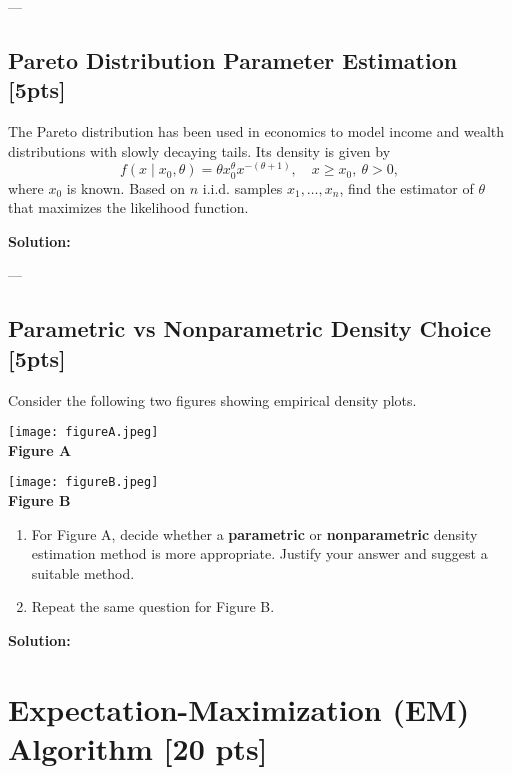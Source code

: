 \documentclass[11pt,epic]{article}
\newenvironment{solution}
  {\par\medskip
  \color{gray}%
   \begin{framed}
   \textbf{Solution: \newline}\ignorespaces}
 {\end{framed}
  \medskip}
\begin{document}
---

\subsection{Pareto Distribution Parameter Estimation [5pts]}  

The Pareto distribution has been used in economics to model income and wealth distributions with slowly decaying tails. Its density is given by  
\[
f(x \mid x_0, \theta) = \theta x_0^{\theta} x^{-(\theta+1)}, \quad x \geq x_0,\ \theta > 0,
\]  
where $x_0$ is known. Based on $n$ i.i.d. samples $x_1,\ldots,x_n$, find the estimator of $\theta$ that maximizes the likelihood function.  

\begin{solution}

\end{solution}  

---

\subsection{Parametric vs Nonparametric Density Choice [5pts]}  

Consider the following two figures showing empirical density plots.  

\begin{center}
\texttt{[image: figureA.jpeg]} \\
\textbf{Figure A}  

\vspace{0.5cm}
\texttt{[image: figureB.jpeg]} \\ 
\textbf{Figure B}  
\end{center}
\begin{enumerate}
    \item For Figure A, decide whether a \textbf{parametric} or \textbf{nonparametric} density estimation method is more appropriate. Justify your answer and suggest a suitable method.  
    \item Repeat the same question for Figure B.  
\end{enumerate}  

\begin{solution}

\end{solution}  


\section{Expectation-Maximization (EM) Algorithm [20 pts]}
\end{document}

